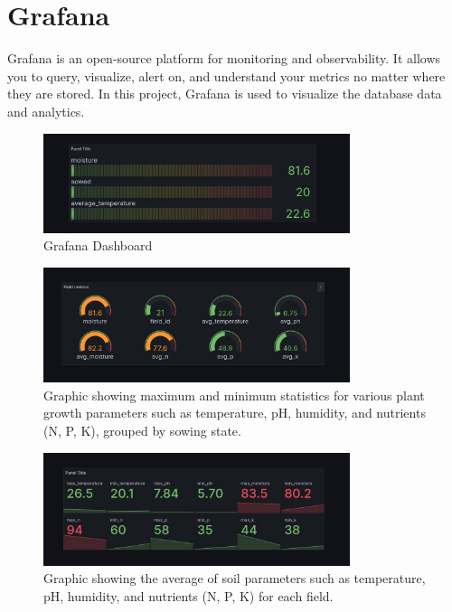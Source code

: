 \chapter{Grafana}

Grafana is an open-source platform for monitoring and observability. It allows you to query, visualize, alert on, and understand your metrics no matter where they are stored. In this project, Grafana is used to visualize the database data and analytics.

\begin{figure}[H]
    \centering
    \includegraphics[width=0.8\textwidth]{media/grafana_1.jpg}
    \caption{Grafana Dashboard}
    \label{fig:grafana}
\end{figure}

\begin{figure} [H]
    \centering
    \includegraphics[width=0.8\textwidth]{media/grafana_2.jpg}
    \caption{Graphic showing maximum and minimum statistics for various plant growth parameters such as temperature, pH, humidity, and nutrients (N, P, K), grouped by sowing state.}   
    \label{fig:grafana}
\end{figure}

\begin{figure} [H]
    \centering
    \includegraphics[width=0.8\textwidth]{media/grafana_3.jpg}
    \caption{Graphic showing the average of soil parameters such as temperature, pH, humidity, and nutrients (N, P, K) for each field.}
    \label{fig:grafana}
\end{figure}